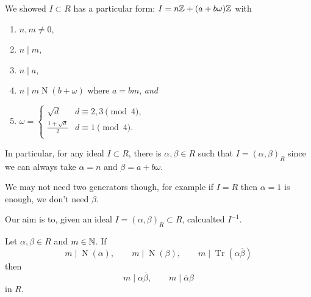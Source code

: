 
We showed $I \subset R$ has a particular form:
$I = n\mathbb{Z} + (a + b\omega)\mathbb{Z}$ with
\begin{enumerate}
	\item $n,m \neq 0$,
	\item $n \mid m$,
	\item $n \mid a$,
	\item $n \mid m \operatorname{N}(b + \omega)$ where $a = bm$, \emph{and}
	\item
		$\omega = \begin{cases}
			\sqrt d & d \equiv 2,3 \pmod 4, \\
			\frac{1 + \sqrt d}{2} & d \equiv 1 \pmod 4. \\
		\end{cases}$
\end{enumerate}

In particular, for any ideal $I \subset R$, there is $\alpha, \beta \in R$
such that $I = (\alpha, \beta)_R$ since we can always take
$\alpha = n$ and $\beta = a + b \omega$.

We may not need two generators though,
for example if $I = R$ then $\alpha = 1$ is enough,
we don't need $\beta$.

Our aim is to, given an ideal $I = (\alpha, \beta)_R \subset R$,
calcualted $I^{-1}$.

\begin{lemma}[Hurwitz]
	Let $\alpha, \beta \in R$ and $m \in \mathbb{N}$.
	If
	\[
		m \mid \operatorname{N}(\alpha), \qquad
		m \mid \operatorname{N}(\beta), \qquad
		m \mid \operatorname{Tr}(\alpha\overline\beta)
	\]
	then
	\[
		m \mid \alpha\overline\beta, \qquad
		m \mid \overline\alpha\beta
	\]
	in $R$.
\end{lemma}

